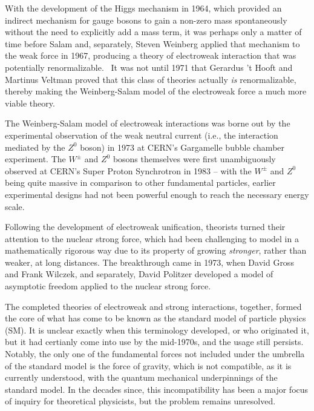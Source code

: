 With the development of the Higgs mechanism in 1964, which provided an indirect mechanism for gauge bosons to gain a non-zero mass spontaneously without the need to explicitly add a mass term\cite{Higgs1964EnglertBrout}\cite{Higgs1964Higgs}\cite{Higgs1964GuralnikHagenKibble}\cite{BroutEnglertArXiv}\cite{guralnik2009}, it was perhaps only a matter of time before Salam and, separately, Steven Weinberg applied that mechanism to the weak force in 1967, producing a theory of electroweak interaction that was potentially renormalizable\cite{Weinberg1967}\cite{salam1968}.~  It was not until 1971 that Gerardus 't Hooft and Martinus Veltman proved that this class of theories actually \emph{is} renormalizable, thereby making the Weinberg-Salam model of the electroweak force a much more viable theory\cite{thooftveltman1972}.

The Weinberg-Salam model of electroweak interactions was borne out by the experimental observation of the weak neutral current (i.e., the interaction mediated by the $Z^0$ boson) in 1973 at CERN's Gargamelle bubble chamber experiment\cite{gargamelle}.  The $W^\pm$ and $Z^0$ bosons themselves were first unambiguously observed at CERN's Super Proton Synchrotron in 1983\cite{UA1W}\cite{UA2W}\cite{UA1Z}\cite{UA2Z} -- with the $W^\pm$ and $Z^0$ being quite massive in comparison to other fundamental particles, earlier experimental designs had not been powerful enough to reach the necessary energy scale.   

Following the development of electroweak unification, 
theorists turned their attention to the nuclear strong force, which had been challenging to model in a mathematically rigorous way due to its property of growing \emph{stronger}, rather than weaker, at long distances.  The breakthrough came in 1973, when David Gross and Frank Wilczek, and separately, David Politzer developed a model of asymptotic freedom applied to the nuclear strong force\cite{gross1973asymptotically}\cite{gross1973ultraviolet}\cite{politzer1973reliable}.  

The completed theories of electroweak and strong interactions, together, formed the core of what has come to be known as the standard model of particle physics (\acs{SM}).  It is unclear exactly when this terminology developed, or who originated it, but it had certianly come into use by the mid-1970s, and the usage still persists\cite{PaisTreiman1975}\cite{weinberginterview2018}.  Notably, the only one of the fundamental forces not included under the umbrella of the standard model is the force of gravity, which is not compatible, as it is currently understood, with the quantum mechanical underpinnings of the standard model.  In the decades since, this incompatibility has been a major focus of inquiry for theoretical physicists, but the problem remains unresolved. 

